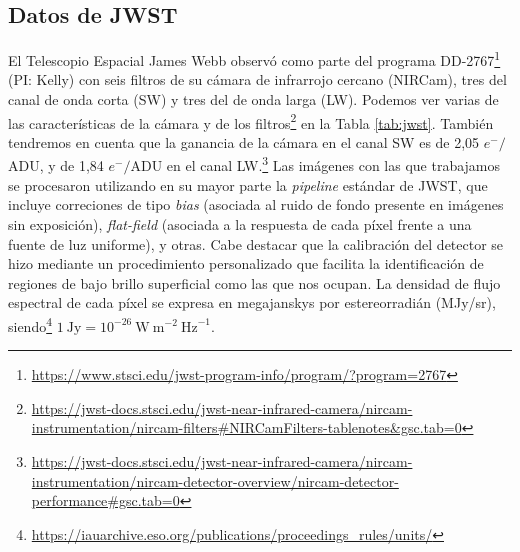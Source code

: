 \subsection{Datos de JWST} \label{sec:jwst}
El Telescopio Espacial James Webb observó \clust{} como parte del programa DD-2767\footnote{\url{https://www.stsci.edu/jwst-program-info/program/?program=2767}} (PI: Kelly) con seis filtros de su cámara de infrarrojo cercano (NIRCam), tres del canal de onda corta (SW) y tres del de onda larga (LW). Podemos ver varias de las características de la cámara y de los filtros\footnote{\url{https://jwst-docs.stsci.edu/jwst-near-infrared-camera/nircam-instrumentation/nircam-filters\#NIRCamFilters-tablenotes&gsc.tab=0}} en la Tabla \ref{tab:jwst}. También tendremos en cuenta que la ganancia de la cámara en el canal SW es de 2,05 \(e^- /\)ADU, y de 1,84 \(e^- /\)ADU en el canal LW.\footnote{\url{https://jwst-docs.stsci.edu/jwst-near-infrared-camera/nircam-instrumentation/nircam-detector-overview/nircam-detector-performance\#gsc.tab=0}} Las imágenes con las que trabajamos se procesaron utilizando en su mayor parte la \textit{pipeline} estándar de JWST, que incluye correciones de tipo \textit{bias} (asociada al ruido de fondo presente en imágenes sin exposición), \textit{flat-field} (asociada a la respuesta de cada píxel frente a una fuente de luz uniforme), y otras. Cabe destacar que la calibración del detector se hizo mediante un procedimiento personalizado \citep{williamsMagnifiedCompactGalaxy2023} que facilita la identificación de regiones de bajo brillo superficial como las que nos ocupan. La densidad de flujo espectral de cada píxel se expresa en megajanskys por estereorradián (MJy/sr), siendo\footnote{\url{https://iauarchive.eso.org/publications/proceedings_rules/units/}} \(1 \: \text{Jy} = 10^{-26} \: \text{W} \: \text{m}^{-2} \: \text{Hz}^{-1}\). \par

